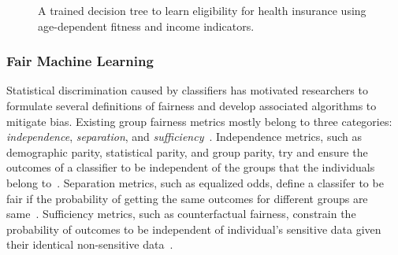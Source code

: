 \begin{figure}
\begin{minipage}{.33\columnwidth}
	\end{minipage}\hspace*{-2em}
	\begin{minipage}{.35\columnwidth}
	\end{minipage}%
	\caption[A decision tree classifier on sensitive and non-sensitive features]{A trained decision tree to learn eligibility for health insurance using age-dependent fitness and income indicators.}\label{fairness_justicia_fig:fair_example}%
\end{figure}


\subsubsection{Fair Machine Learning} Statistical discrimination caused by classifiers has motivated researchers to formulate several definitions of fairness and develop associated algorithms to mitigate bias.   Existing group fairness metrics mostly belong to three categories: \textit{independence}, \textit{separation}, and \textit{sufficiency}~\cite{mehrabi2019survey}. Independence metrics, such as demographic parity, statistical parity, and group parity, try and ensure the outcomes of a classifier to be independent of the groups that the individuals belong to~\cite{feldman2015certifying,dwork2012fairness}. Separation metrics, such as equalized odds, define a classifer to be fair if the probability of getting the same outcomes for different groups are same~\cite{hardt2016equality}. Sufficiency metrics, such as counterfactual fairness, constrain the probability of outcomes to be independent of individual's sensitive data given their identical non-sensitive data~\cite{kusner2017counterfactual}.

